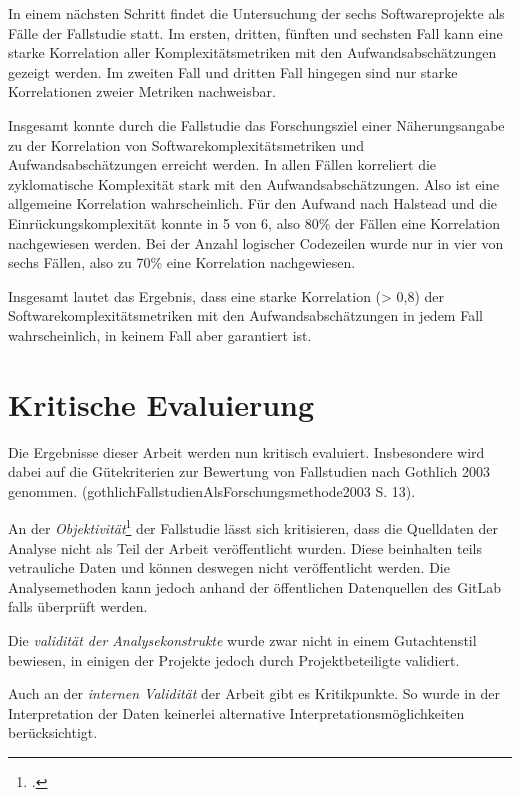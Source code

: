 In einem nächsten Schritt findet die Untersuchung der sechs
Softwareprojekte als Fälle der Fallstudie statt. Im ersten, dritten,
fünften und sechsten Fall kann eine starke Korrelation aller
Komplexitätsmetriken mit den Aufwandsabschätzungen gezeigt werden. Im
zweiten Fall und dritten Fall hingegen sind nur starke Korrelationen
zweier Metriken nachweisbar.

Insgesamt konnte durch die Fallstudie das Forschungsziel einer
Näherungsangabe zu der Korrelation von Softwarekomplexitätsmetriken und
Aufwandsabschätzungen erreicht werden. In allen Fällen korreliert die
zyklomatische Komplexität stark mit den Aufwandsabschätzungen. Also ist
eine allgemeine Korrelation wahrscheinlich. Für den Aufwand nach
Halstead und die Einrückungskomplexität konnte in 5 von 6, also 80\% der
Fällen eine Korrelation nachgewiesen werden. Bei der Anzahl logischer
Codezeilen wurde nur in vier von sechs Fällen, also zu 70\% eine
Korrelation nachgewiesen.

Insgesamt lautet das Ergebnis, dass eine starke Korrelation
(\textgreater{} 0,8) der Softwarekomplexitätsmetriken mit den
Aufwandsabschätzungen in jedem Fall wahrscheinlich, in keinem Fall aber
garantiert ist.

\section{Kritische Evaluierung}\label{kritische-evaluierung}

Die Ergebnisse dieser Arbeit werden nun kritisch evaluiert. Insbesondere
wird dabei auf die Gütekriterien zur Bewertung von Fallstudien nach
Gothlich 2003 genommen. (gothlichFallstudienAlsForschungsmethode2003 S.
13).

An der \emph{Objektivität}\footcite[Vgl. ][]{gothlichFallstudienAlsForschungsmethode2003
  S. 13} der Fallstudie lässt sich kritisieren, dass die Quelldaten der
Analyse nicht als Teil der Arbeit veröffentlicht wurden. Diese
beinhalten teils vetrauliche Daten und können deswegen nicht
veröffentlicht werden. Die Analysemethoden kann jedoch anhand der
öffentlichen Datenquellen des GitLab falls überprüft werden.

Die \emph{validität der Analysekonstrukte} wurde zwar nicht in einem
Gutachtenstil bewiesen, in einigen der Projekte jedoch durch
Projektbeteiligte validiert.

Auch an der \emph{internen Validität} der Arbeit gibt es Kritikpunkte.
So wurde in der Interpretation der Daten keinerlei alternative
Interpretationsmöglichkeiten berücksichtigt.

